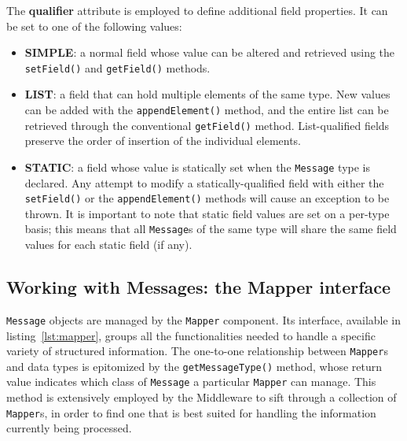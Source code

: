 The \textbf{qualifier} attribute is employed to define additional field
properties. It can be set to one of the following values:

\begin{itemize}

  \item \textbf{SIMPLE}: a normal field whose value can be altered and
      retrieved using the \texttt{setField()} and \texttt{getField()} methods.

  \item \textbf{LIST}: a field that can hold multiple elements of the same
      type. New values can be added with the \texttt{appendElement()} method,
      and the entire list can be retrieved through the conventional
      \texttt{getField()} method. List-qualified fields preserve the order of
      insertion of the individual elements.

  \item \textbf{STATIC}: a field whose value is statically set when the
      \texttt{Message} type is declared. Any attempt to modify a
      statically-qualified field with either the \texttt{setField()} or the
      \texttt{appendElement()} methods will cause an exception to be thrown. It
      is important to note that static field values are set on a per-type
      basis; this means that all \texttt{Message}s of the same type will share
      the same field values for each static field (if any).
      
\end{itemize}


\subsection{Working with Messages: the Mapper interface}

\texttt{Message} objects are managed by the \texttt{Mapper} component. Its
interface, available in listing~\ref{lst:mapper}, groups all the
functionalities needed to handle a specific variety of structured information.
The one-to-one relationship between \texttt{Mapper}s and data types is
epitomized by the \texttt{getMessageType()} method, whose return value
indicates which class of \texttt{Message} a particular \texttt{Mapper} can
manage. This method is extensively employed by the Middleware to sift through a
collection of \texttt{Mapper}s, in order to find one that is best suited for
handling the information currently being processed.

